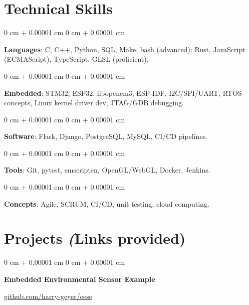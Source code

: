 \documentclass[10pt, letterpaper]{article}
\newenvironment{onecolentry}{
    \begin{adjustwidth}{
        0 cm + 0.00001 cm
    }{
        0 cm + 0.00001 cm
    }
}{
    \end{adjustwidth}
}
\newenvironment{twocolentry}[2][]{
    \onecolentry
    \def\secondColumn{#2}
    \setcolumnwidth{\fill, 4.75 cm}
    \begin{paracol}{2}
}{
    \switchcolumn \raggedleft \secondColumn
    \end{paracol}
    \endonecolentry
}
\begin{document}
    \section{Technical Skills}

        \begin{onecolentry}
            \textbf{Languages}: C, C++, Python, SQL, Make, bash (advanced); Rust, JavaScript (ECMAScript), TypeScript, GLSL (proficient).
        \end{onecolentry}

        \vspace{0.2 cm}

        \begin{onecolentry}
            \textbf{Embedded}: STM32, ESP32, libopencm3, ESP-IDF, I2C/SPI/UART, RTOS concepts, Linux kernel driver dev, JTAG/GDB debugging.
        \end{onecolentry}

        \vspace{0.2 cm}

        \begin{onecolentry}
            \textbf{Software}: Flask, Django, PostgreSQL, MySQL, CI/CD pipelines.
        \end{onecolentry}

        \vspace{0.2 cm}

        \begin{onecolentry}
            \textbf{Tools}: Git, pytest, emscripten, OpenGL/WebGL, Docker, Jenkins.
        \end{onecolentry}

        \vspace{0.2 cm}

        \begin{onecolentry}
            \textbf{Concepts}: Agile, SCRUM, CI/CD, unit testing, cloud computing.
        \end{onecolentry}

    \section{Projects \textit(Links provided)}

        \begin{twocolentry}{\href{https://github.com/harry-geyer/eese}{github.com/harry-geyer/eese}}
            \textbf{Embedded Environmental Sensor Example}
        \end{twocolentry}
\end{document}
